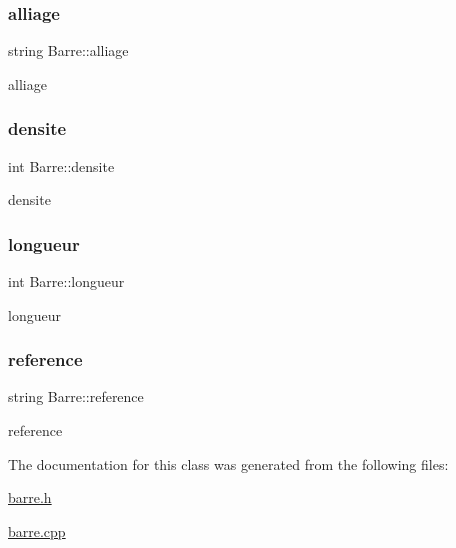 \subsubsection{\texorpdfstring{alliage}{alliage}}
{\footnotesize\ttfamily string Barre\+::alliage\hspace{0.3cm}{\ttfamily [protected]}}



alliage 

\mbox{\label{class_barre_ac1cd6c9bf264de964edf9ab0b2c40519}} 
\subsubsection{\texorpdfstring{densite}{densite}}
{\footnotesize\ttfamily int Barre\+::densite\hspace{0.3cm}{\ttfamily [protected]}}



densite 

\mbox{\label{class_barre_a59f5637eaf9c15084deafab15f0de07d}} 
\subsubsection{\texorpdfstring{longueur}{longueur}}
{\footnotesize\ttfamily int Barre\+::longueur\hspace{0.3cm}{\ttfamily [protected]}}



longueur 

\mbox{\label{class_barre_a787dda4b06eba9eac805fc67720d4a11}} 
\subsubsection{\texorpdfstring{reference}{reference}}
{\footnotesize\ttfamily string Barre\+::reference\hspace{0.3cm}{\ttfamily [protected]}}



reference 



The documentation for this class was generated from the following files\+:\begin{DoxyCompactItemize}
\item 
\hyperlink{barre_8h}{barre.\+h}\item 
\hyperlink{barre_8cpp}{barre.\+cpp}\end{DoxyCompactItemize}
